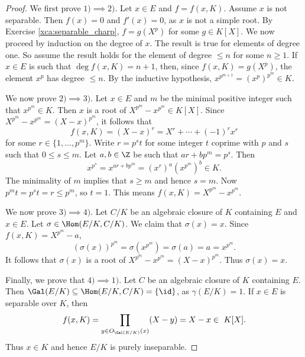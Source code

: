 \begin{proof}
    We first prove $1)\implies 2)$. 
    Let $x\in E$ and $f=f(x,K)$. Assume $x$ is not separable. Then
    $f(x)=0$ and $f'(x)=0$, as $x$ is not a simple root. By Exercise \ref{xca:separable_charp}, 
    $f=g(X^p)$ for some $g\in K[X]$. 
    We now proceed by induction on the degree of $x$. The result
    is true for elements of degree one. So assume the result holds for the element of degree $\leq n$ 
    for some $n\geq1$. 
    If $x\in E$ is such that $\deg f(x,K)=n+1$, then, since $f(x,K)=g(X^p)$, the element 
    $x^p$ has degree $\leq n$. By the inductive hypothesis, $x^{p^{m+1}}=(x^p)^{p^m}\in K$.  

    We now prove $2)\implies 3)$. Let $x\in E$ and $m$ be the minimal positive integer 
    such that $x^{p^m}\in K$. Then
    $x$ is a root of $X^{p^m}-x^{p^m}\in K[X]$. Since 
    $X^{p^m}-x^{p^m}=(X-x)^{p^m}$, it follows that 
    \[
    f(x,K)=(X-x)^r=X^r+\cdots+(-1)^rx^r
    \]
    for some
    $r\in\{1,\dots,p^m\}$. Write $r=p^st$ for some integer $t$ coprime with $p$ and $s$ such that
    $0\leq s\leq m$. Let $a,b\in\Z$ be such that $ar+bp^m=p^s$. Then 
    \[
    x^{p^s}=x^{ar+bp^m}=\left(x^r\right)^a\left(x^{p^m}\right)^b\in K.
    \]
    The minimality of $m$ implies that $s\geq m$ and hence $s=m$. Now $p^mt=p^st=r\leq p^m$, so $t=1$. 
    This means $f(x,K)=X^{p^m}-x^{p^m}$. 
    
    We now prove $3)\implies 4)$. Let $C/K$ be an algebraic closure of $K$ containing $E$ and $x\in E$.  
    Let $\sigma\in\Hom(E/K,C/K)$. We claim that $\sigma(x)=x$. Since 
    $f(x,K)=X^{p^m}-a$, 
    \[
    \left(\sigma(x)\right)^{p^m}=\sigma\left(x^{p^m}\right)=\sigma(a)=a=x^{p^m}.
    \]
    It follows that $\sigma(x)$ is a root of $X^{p^m}-x^{p^m}=(X-x)^{p^m}$. 
    Thus $\sigma(x)=x$. 
    
    Finally, we prove that $4)\implies1)$. Let 
    $C$ be an algebraic closure of $K$ containing $E$. 
    Then $\Gal(E/K)\subseteq\Hom(E/K,C/K)=\{\id\}$, as $\gamma(E/K)=1$. 
    If $x\in E$ is separable over $K$, then
    \[
    f(x,K)=\prod_{y\in O_{\Gal(E/K)}(x)}(X-y)=X-x\in\ K[X].
    \]
    Thus $x\in K$ and hence $E/K$ is purely inseparable. 
\end{proof}

